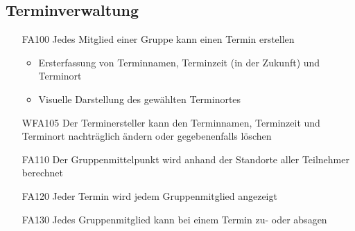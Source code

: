 \documentclass{scrartcl}
\begin{document}
		\subsection{Terminverwaltung}
		\begin{itemize}
			\hypertarget{FA100}{}
			\item[FA100] Jedes Mitglied einer Gruppe kann einen Termin erstellen
			
			\begin{itemize}
				\item Ersterfassung von Terminnamen, Terminzeit (in der Zukunft) und Terminort
			\end{itemize}
			
			\begin{itemize}
				\item Visuelle Darstellung des gewählten Terminortes
			\end{itemize}
			\hypertarget{WFA105}{}
			\item[WFA105] Der Terminersteller kann den Terminnamen, Terminzeit und Terminort nachträglich ändern oder gegebenenfalls löschen
			\hypertarget{FA110}{}
			\item[FA110] Der Gruppenmittelpunkt wird anhand der Standorte aller Teilnehmer berechnet		
			\hypertarget{FA120}{}
			\item[FA120] Jeder Termin wird jedem Gruppenmitglied angezeigt
			\hypertarget{FA130}{}
			\item[FA130] Jedes Gruppenmitglied kann bei einem Termin zu- oder absagen
			
		\end{itemize}
		
\end{document}
